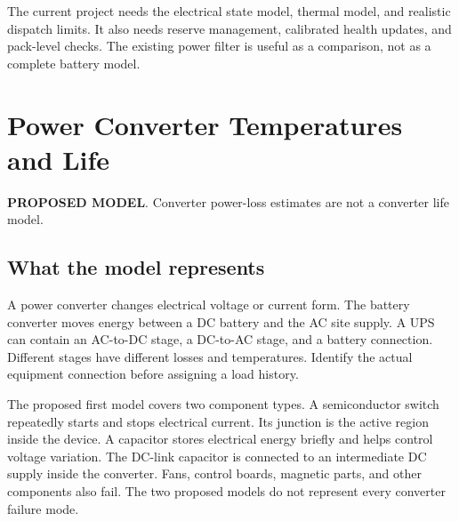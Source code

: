 \documentclass[11pt,a4paper]{report}
\newcommand{\proposed}{\textbf{\textcolor{reportblue}{PROPOSED MODEL}}}
\begin{document}
The current project needs the electrical state model, thermal model, and realistic dispatch limits.
It also needs reserve management, calibrated health updates, and pack-level checks.
The existing power filter is useful as a comparison, not as a complete battery model.

\chapter{Power Converter Temperatures and Life}
\label{chap:converter}
\proposed. Converter power-loss estimates are not a converter life model.

\section{What the model represents}
A power converter changes electrical voltage or current form.
The battery converter moves energy between a DC battery and the AC site supply.
A UPS can contain an AC-to-DC stage, a DC-to-AC stage, and a battery connection.
Different stages have different losses and temperatures.
Identify the actual equipment connection before assigning a load history.

The proposed first model covers two component types.
A semiconductor switch repeatedly starts and stops electrical current.
Its junction is the active region inside the device.
A capacitor stores electrical energy briefly and helps control voltage variation.
The DC-link capacitor is connected to an intermediate DC supply inside the converter.
Fans, control boards, magnetic parts, and other components also fail.
The two proposed models do not represent every converter failure mode.
\end{document}
